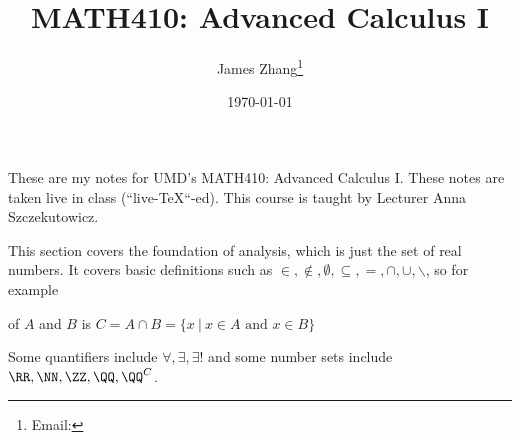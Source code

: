 \documentclass[12pt]{scrartcl}
\begin{document}
\title{MATH410: Advanced Calculus I}
\author{James Zhang\thanks{Email: }}
\date{\today}



\maketitle
    These are my notes for UMD's MATH410: Advanced Calculus I. 
    These notes are taken live in class (``live-\TeX``-ed).
    This course is taught by Lecturer Anna Szczekutowicz. 
\tableofcontents
\newpage

This section covers the foundation of analysis, which is just the set of real numbers. 
It covers basic definitions such as $\in, \notin, \emptyset, \subseteq, =, \cap, \cup, \backslash$, so for example

\begin{definition}
   of $A$ and $B$ is $C= A \cap B = \{x \ | \ x \in A \text{ and } x \in B\}$
\end{definition}

Some quantifiers include $\forall, \exists, \exists!$ and some number sets include $\RR, \NN, \ZZ, \QQ, \QQ^C$. 
\end{document}
